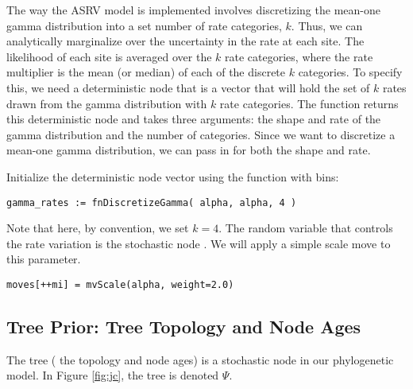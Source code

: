 The way the ASRV model is implemented involves discretizing the mean-one gamma distribution into a set number of rate categories, $k$. 
Thus, we can analytically marginalize over the uncertainty in the rate at each site. 
The likelihood of each site is averaged over the $k$ rate categories, where the rate multiplier is the mean (or median) of each of the discrete $k$ categories. 
To specify this, we need a deterministic node that is a vector that will hold the set of $k$ rates drawn from the gamma distribution with $k$ rate categories. 
The  function returns this deterministic node and takes three arguments: the shape and rate of the gamma distribution and the number of categories. 
Since we want to discretize a mean-one gamma distribution, we can pass in  for both the shape and rate.

Initialize the  deterministic node vector using the   function with  bins:
{\tt \begin{snugshade*}
\begin{lstlisting}
gamma_rates := fnDiscretizeGamma( alpha, alpha, 4 )
\end{lstlisting}
\end{snugshade*}}

Note that here, by convention, we set $k = 4$.
The random variable that controls the rate variation is the stochastic node . 
We will apply a simple scale move to this parameter.
{\tt \begin{snugshade*}
\begin{lstlisting}
moves[++mi] = mvScale(alpha, weight=2.0)
\end{lstlisting}
\end{snugshade*}}


\subsection{Tree Prior: Tree Topology and Node Ages}

The tree ( the topology and node ages) is a stochastic node in our phylogenetic model. 
In Figure \ref{fig:jc}, the tree is denoted $\Psi$.

